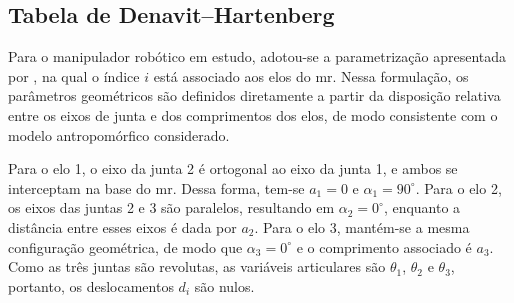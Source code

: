 



\subsection{Tabela de Denavit--Hartenberg}

Para o manipulador robótico em estudo, adotou-se a parametrização apresentada por \cite{sciavicco_siciliano2010}, na qual o índice $i$ está associado aos elos do \gls{mr}. Nessa formulação, os parâmetros geométricos são definidos diretamente a partir da disposição relativa entre os eixos de junta e dos comprimentos dos elos, de modo consistente com o modelo antropomórfico considerado.

Para o elo 1, o eixo da junta 2 é ortogonal ao eixo da junta 1, e ambos se interceptam na base do \gls{mr}. Dessa forma, tem-se $a_1=0$ e $\alpha_1=90^\circ$. Para o elo 2, os eixos das juntas 2 e 3 são paralelos, resultando em $\alpha_2=0^\circ$, enquanto a distância entre esses eixos é dada por $a_2$. Para o elo 3, mantém-se a mesma configuração geométrica, de modo que $\alpha_3=0^\circ$ e o comprimento associado é $a_3$. Como as três juntas são revolutas, as variáveis articulares são $\theta_1$, $\theta_2$ e $\theta_3$, portanto, os deslocamentos $d_i$ são nulos.

